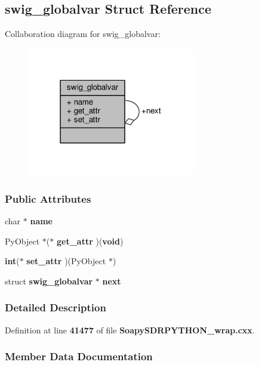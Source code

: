 \subsection{swig\+\_\+globalvar Struct Reference}
\label{structswig__globalvar}


Collaboration diagram for swig\+\_\+globalvar\+:
\nopagebreak
\begin{figure}[H]
\begin{center}
\leavevmode
\includegraphics[width=207pt]{d0/db3/structswig__globalvar__coll__graph}
\end{center}
\end{figure}
\subsubsection*{Public Attributes}
\begin{DoxyCompactItemize}
\item 
char $\ast$ {\bf name}
\item 
Py\+Object $\ast$($\ast$ {\bf get\+\_\+attr} )({\bf void})
\item 
{\bf int}($\ast$ {\bf set\+\_\+attr} )(Py\+Object $\ast$)
\item 
struct {\bf swig\+\_\+globalvar} $\ast$ {\bf next}
\end{DoxyCompactItemize}


\subsubsection{Detailed Description}


Definition at line {\bf 41477} of file {\bf Soapy\+S\+D\+R\+P\+Y\+T\+H\+O\+N\+\_\+wrap.\+cxx}.



\subsubsection{Member Data Documentation}

